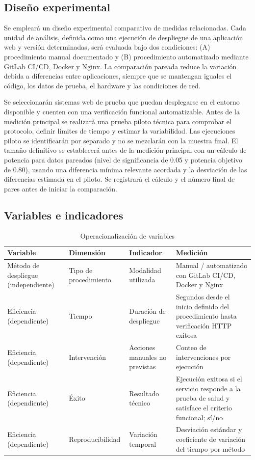 \documentclass[12pt,a4paper]{article}
\begin{document}
\subsection{Diseño experimental}

Se empleará un diseño experimental comparativo de medidas relacionadas. Cada unidad de análisis, definida como una ejecución de despliegue de una aplicación web y versión determinadas, será evaluada bajo dos condiciones: (A) procedimiento manual documentado y (B) procedimiento automatizado mediante GitLab CI/CD, Docker y Nginx. La comparación pareada reduce la variación debida a diferencias entre aplicaciones, siempre que se mantengan iguales el código, los datos de prueba, el hardware y las condiciones de red.

Se seleccionarán sistemas web de prueba que puedan desplegarse en el entorno disponible y cuenten con una verificación funcional automatizable. Antes de la medición principal se realizará una prueba piloto técnica para comprobar el protocolo, definir límites de tiempo y estimar la variabilidad. Las ejecuciones piloto se identificarán por separado y no se mezclarán con la muestra final. El tamaño definitivo se establecerá antes de la medición principal con un cálculo de potencia para datos pareados (nivel de significancia de 0.05 y potencia objetivo de 0.80), usando una diferencia mínima relevante acordada y la desviación de las diferencias estimada en el piloto. Se registrará el cálculo y el número final de pares antes de iniciar la comparación.

\subsection{Variables e indicadores}

\begin{table}[htbp]
\centering
\small
\caption{Operacionalización de variables}
\label{tab:variables}
\begin{tabularx}{\textwidth}{>{\raggedright\arraybackslash}p{2.6cm} >{\raggedright\arraybackslash}p{2.8cm} >{\raggedright\arraybackslash}p{3.2cm} X}
\toprule
Variable & Dimensión & Indicador & Medición \\
\midrule
Método de despliegue (independiente) & Tipo de procedimiento & Modalidad utilizada & Manual / automatizado con GitLab CI/CD, Docker y Nginx \\
Eficiencia (dependiente) & Tiempo & Duración de despliegue & Segundos desde el inicio definido del procedimiento hasta verificación HTTP exitosa \\
Eficiencia (dependiente) & Intervención & Acciones manuales no previstas & Conteo de intervenciones por ejecución \\
Eficiencia (dependiente) & Éxito & Resultado técnico & Ejecución exitosa si el servicio responde a la prueba de salud y satisface el criterio funcional; sí/no \\
Eficiencia (dependiente) & Reproducibilidad & Variación temporal & Desviación estándar y coeficiente de variación del tiempo por método \\
\bottomrule
\end{tabularx}
\end{table}
\end{document}
